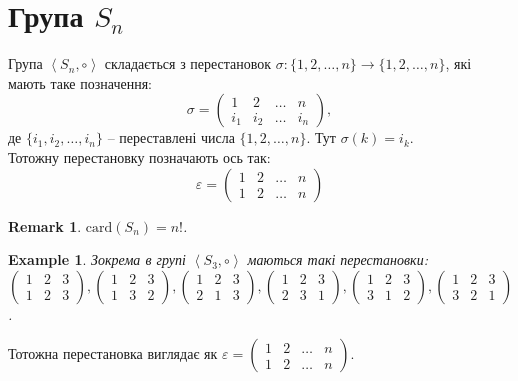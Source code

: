 \documentclass[a4paper, 10pt]{article}
\theoremstyle{theoremdd}
\theoremstyle{theoremdd}
\theoremstyle{theoremdd}
\theoremstyle{theoremdd}
\theoremstyle{theoremdd}
\newtheorem{example}[theorem]{Example}
\theoremstyle{theoremdd}
\theoremstyle{theoremdd}
\theoremstyle{theoremdd}
\theoremstyle{theoremdd}
\theoremstyle{theoremdd}
\theoremstyle{theoremdd}
\newtheorem{remark}[theorem]{Remark}
\theoremstyle{theoremdd}
\theoremstyle{theoremdd}
\theoremstyle{theoremdd}
\theoremstyle{theoremdd}
\begin{document}
\section*{Група $S_n$}
Група $\left<S_n, \circ \right>$ складається з перестановок $\sigma \colon \{1,2,\dots,n\} \to \{1,2,\dots,n\}$, які мають таке позначення:
$$ \sigma = \begin{pmatrix}
1 & 2 & \dots & n \\
i_1 & i_2 & \dots & i_n
\end{pmatrix},$$
де $\{i_1,i_2,\dots,i_n\}$ -- переставлені числа $\{1,2,\dots,n\}$. Тут $\sigma(k) = i_k$.
\bigskip \\
Тотожну перестановку позначають ось так:
$$ \varepsilon = \begin{pmatrix}
1 & 2 & \dots & n \\
1 & 2 & \dots & n 
\end{pmatrix} $$

\begin{remark}
$\text{card}(S_n) = n!$.
\end{remark}

\begin{example}
Зокрема в групі $\left< S_3, \circ \right>$ маються такі перестановки:\\
$\begin{pmatrix}
1 & 2 & 3 \\
1 & 2 & 3
\end{pmatrix}, \begin{pmatrix}
1 & 2 & 3 \\
1 & 3 & 2
\end{pmatrix}, \begin{pmatrix}
1 & 2 & 3 \\
2 & 1 & 3
\end{pmatrix}, \begin{pmatrix}
1 & 2 & 3 \\
2 & 3 & 1
\end{pmatrix}, \begin{pmatrix}
1 & 2 & 3 \\
3 & 1 & 2
\end{pmatrix}, \begin{pmatrix}
1 & 2 & 3 \\
3 & 2 & 1
\end{pmatrix}$.
\end{example}

Тотожна перестановка виглядає як $\varepsilon = \begin{pmatrix}
1 & 2 & \dots & n \\
1 & 2 & \dots & n
\end{pmatrix}$.\\
\end{document}
